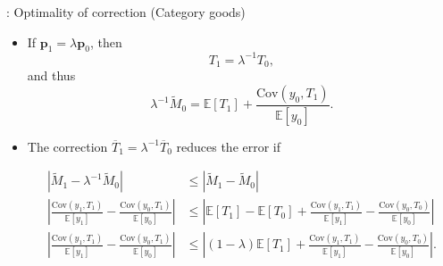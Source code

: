 \documentclass[10pt, handout]{beamer}
\begin{document}
\begin{frame}[label=Category-OptimalityCondition]{\secname: Optimality of correction (Category goods) \hyperlink{Category-Error}{\beamerreturnbutton}}
	\vfill
	\begin{itemize}
		\item If $\mathbf{p}_{1} = \lambda \mathbf{p}_{0}$, then
				$$T_{1} = \lambda^{-1}T_{0},$$
			and thus
				$$\lambda^{-1}\tilde{M}_{0} = \mathbb{E}[T_{1}] + \frac{\mathrm{Cov}\left(y_{0}, T_{1} \right)}{\mathbb{E}[y_{0}]}.$$ \vfill
	
		\item The correction $\overline{T}_{1} = \lambda^{-1}\overline{T}_{0}$ reduces the error if
				\begin{small}$$\begin{aligned}
					\left|\tilde{M}_{1} - \lambda^{-1}\tilde{M}_{0} \right|
						&\leq \left|\tilde{M}_{1} - \tilde{M}_{0} \right|	\\
					\left| \frac{\mathrm{Cov}\left(y_{1}, T_{1} \right)}{\mathbb{E}[y_{1}]} - \frac{\mathrm{Cov}\left(y_{0}, T_{1} \right)}{\mathbb{E}[y_{0}]} \right|
						&\leq \left| \mathbb{E}\left[T_{1} \right] - \mathbb{E}\left[T_{0} \right] + \frac{\mathrm{Cov}\left(y_{1}, T_{1} \right)}{\mathbb{E}[y_{1}]} - \frac{\mathrm{Cov}\left(y_{0}, T_{0} \right)}{\mathbb{E}[y_{0}]} \right|	\\
					\left| \frac{\mathrm{Cov}\left(y_{1}, T_{1} \right)}{\mathbb{E}[y_{1}]} - \frac{\mathrm{Cov}\left(y_{0}, T_{1} \right)}{\mathbb{E}[y_{0}]} \right|
						&\leq \left| (1-\lambda)\mathbb{E}\left[T_{1} \right] + \frac{\mathrm{Cov}\left(y_{1}, T_{1} \right)}{\mathbb{E}[y_{1}]} - \frac{\mathrm{Cov}\left(y_{0}, T_{0} \right)}{\mathbb{E}[y_{0}]} \right|.
				\end{aligned}$$\end{small} \vfill
	\end{itemize}
\end{frame}
\end{document}
